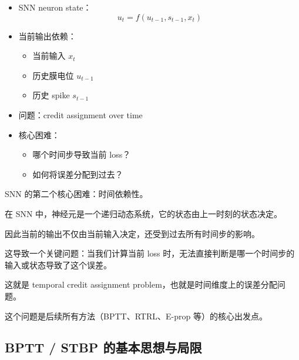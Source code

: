 \documentclass[journal,12pt,onecolumn]{IEEEtran}
\begin{document}
\begin{itemize}
  \item SNN neuron state：
  \[
    u_t = f(u_{t-1}, s_{t-1}, x_t)
  \]

  \item 当前输出依赖：
  \begin{itemize}
    \item 当前输入 $x_t$
    \item 历史膜电位 $u_{t-1}$
    \item 历史 spike $s_{t-1}$
  \end{itemize}

  \item 问题：credit assignment over time

  \item 核心困难：
  \begin{itemize}
    \item 哪个时间步导致当前 loss？
    \item 如何将误差分配到过去？
  \end{itemize}
\end{itemize}

SNN 的第二个核心困难：时间依赖性。

在 SNN 中，神经元是一个递归动态系统，它的状态由上一时刻的状态决定。

因此当前的输出不仅由当前输入决定，还受到过去所有时间步的影响。

这导致一个关键问题：当我们计算当前 loss 时，无法直接判断是哪一个时间步的输入或状态导致了这个误差。

这就是 temporal credit assignment problem，也就是时间维度上的误差分配问题。

这个问题是后续所有方法（BPTT、RTRL、E-prop 等）的核心出发点。


\subsection{BPTT / STBP 的基本思想与局限}
\end{document}
